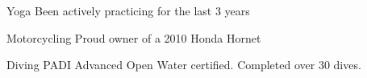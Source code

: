 


\begin{cvskills}






\cvskill
{Yoga} %
{Been actively practicing for the last 3 years} %


\cvskill
{Motorcycling} %
{Proud owner of a 2010 Honda Hornet} %




\cvskill
{Diving} %
{PADI Advanced Open Water certified. Completed over 30 dives.} %


\end{cvskills}
